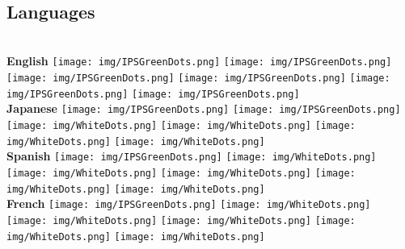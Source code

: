 \documentclass[]{friggeri-cv_reccius-experiment}
\begin{document}
~
\newcommand{\belowspace}{\vspace*{0.85mm}}
\begin{below1}
  \section{Languages}
    \\\vspace{1.7mm}
    \textbf{English}\hfill
    \texttt{[image: img/IPSGreenDots.png]}
    \texttt{[image: img/IPSGreenDots.png]}
    \texttt{[image: img/IPSGreenDots.png]}
    \texttt{[image: img/IPSGreenDots.png]}
    \texttt{[image: img/IPSGreenDots.png]}
    \texttt{[image: img/IPSGreenDots.png]}\\
    \belowspace
    \textbf{Japanese}\hfill
    \texttt{[image: img/IPSGreenDots.png]}
    \texttt{[image: img/IPSGreenDots.png]}
    \texttt{[image: img/WhiteDots.png]}
    \texttt{[image: img/WhiteDots.png]}
    \texttt{[image: img/WhiteDots.png]}
    \texttt{[image: img/WhiteDots.png]}\\
    \belowspace
    \textbf{Spanish}\hfill
    \texttt{[image: img/IPSGreenDots.png]}
    \texttt{[image: img/WhiteDots.png]}
    \texttt{[image: img/WhiteDots.png]}
    \texttt{[image: img/WhiteDots.png]}
    \texttt{[image: img/WhiteDots.png]}
    \texttt{[image: img/WhiteDots.png]}\\
    \belowspace
    \textbf{French}\hfill
    \texttt{[image: img/IPSGreenDots.png]}
    \texttt{[image: img/WhiteDots.png]}
    \texttt{[image: img/WhiteDots.png]}
    \texttt{[image: img/WhiteDots.png]}
    \texttt{[image: img/WhiteDots.png]}
    \texttt{[image: img/WhiteDots.png]}\\~
\end{below1}
\end{document}
